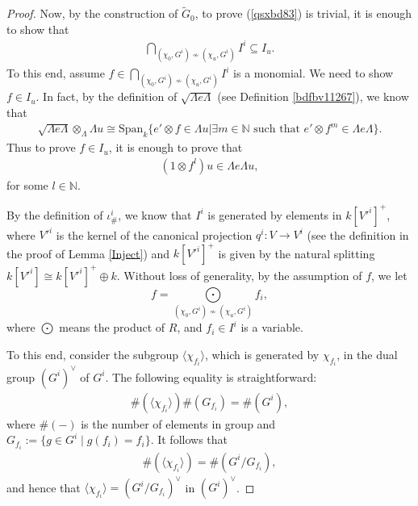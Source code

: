 \documentclass[11pt,reqno]{amsart}
\theoremstyle{definition}
\begin{document}
\begin{proof}
Now, by the construction of $\tilde{G}_0$, to prove (\ref{qsxbd83}) is trivial, it is enough to show that 
\begin{align}\label{2736sdd}
\bigcap\limits_{(\chi_0, G^i) \not\sim (\chi_u, G^i)} I^i \subseteq I_u.
\end{align}
To this end, assume 
$f \in \bigcap\limits_{(\chi_0, G^i) 
\not\sim (\chi_u, G^i)} I^i $ is 
a monomial.
We need to show $f \in I_u$. 
In fact,
by the definition of 
$\sqrt{\Lambda e \Lambda}$ 
(see Definition \ref{bdfbv11267}), 
we know that 
\begin{align}\label{ahjd 710}
\sqrt{\Lambda e \Lambda} \otimes_{\Lambda} \Lambda u \cong 
\mathrm{Span}_{k}\Big\{ e' \otimes f \in 
\Lambda u \big\vert \exists m \in 
\mathbb{N}\mbox{ such that }
e' \otimes f^m \in \Lambda e \Lambda  
\Big\}. 
\end{align}
Thus to prove $f \in I_u$, it is enough to prove that 
\begin{align}\label{hxowc453}
(1 \otimes f^l)u \in \Lambda e \Lambda u,
\end{align}
for some $l \in \mathbb{N}$.


\vspace{2mm}

By the definition of $\iota_{\#}^i$, we know that 
$I^i$ is generated by elements in $k[V'^{i}]^{+}$, where $V'^{i}$ is the
kernel of the canonical projection $q^i: V \rightarrow V^i$ 
(see the definition in the proof of Lemma \ref{Inject}) and 
$k[V'^{i}]^{+}$ is given by the natural splitting 
$k[V'^{i}] \cong k[V'^{i}]^{+} \oplus k$. 
Without loss of generality, by the assumption of $f$, we let 
$$
f = \bigodot\limits_{(\chi_0, G^i) \not\sim (\chi_u, G^i)} f_i,
$$
where $\bigodot$ means 
the product of $R$, and $f_i \in I^i$ is a variable. 

To this end, consider the subgroup
$\langle\chi_{f_i}\rangle$, which 
is generated by $\chi_{f_i}$, in 
the dual group
$(G^i)^{\vee}$ of $G^i$. The following equality is straightforward: 
\begin{align}\label{BUXGECG3}
\#(\langle\chi_{f_i}\rangle) \#(G_{f_i}) = \#(G^i),
\end{align}
where $\#(-)$ is
the number of elements in group and
$G_{f_i} := \{g \in G^i \mid g(f_i) = f_i \}$. 
It follows that 
\begin{align}\label{BUXGECG322}
\#(\langle\chi_{f_i}\rangle)  = \#(G^i / G_{f_i}),
\end{align}
and hence that $\langle\chi_{f_i}\rangle 
=  (G^i / G_{f_i})^{\vee}$ in $(G^i)^{\vee}$.  


\end{proof}
\end{document}
